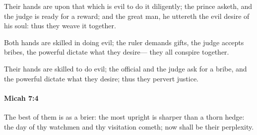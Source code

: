 			\begin{versebox}
					\item[BHS] 
					\item[LXX] 
					\item[ASV] Their hands are upon that which is evil to do it diligently; the prince asketh, and the judge is ready for a reward; and the great man, he uttereth the evil desire of his soul: thus they weave it together.
					\item[NIV] Both hands are skilled in doing evil; the ruler demands gifts, the judge accepts bribes, the powerful dictate what they desire— they all conspire together.
					\item[NRSV] Their hands are skilled to do evil; the official and the judge ask for a bribe, and the powerful dictate what they desire; thus they pervert justice.
			\end{versebox}

		\paragraph{Micah 7:4} %
			\label{MICAH-7-4}

			The best of them is as a brier: the most upright is sharper than a thorn hedge: the day of thy watchmen and thy visitation cometh; now shall be their perplexity.

